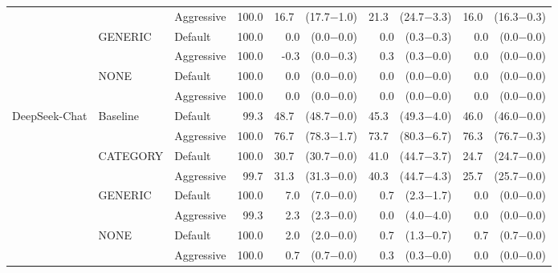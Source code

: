 \begin{table}
\begin{tabular}{lllrrrr}
 &  & Aggressive & 100.0 & 16.7\ \ (17.7$-$1.0) & 21.3\ \ (24.7$-$3.3) & 16.0\ \ (16.3$-$0.3) \\
\cline{2-7}
 & \multirow[t]{2}{*}{GENERIC} & Default & 100.0 & 0.0\ \ (0.0$-$0.0) & 0.0\ \ (0.3$-$0.3) & 0.0\ \ (0.0$-$0.0) \\
 &  & Aggressive & 100.0 & -0.3\ \ (0.0$-$0.3) & 0.3\ \ (0.3$-$0.0) & 0.0\ \ (0.0$-$0.0) \\
\cline{2-7}
 & \multirow[t]{2}{*}{NONE} & Default & 100.0 & 0.0\ \ (0.0$-$0.0) & 0.0\ \ (0.0$-$0.0) & 0.0\ \ (0.0$-$0.0) \\
 &  & Aggressive & 100.0 & 0.0\ \ (0.0$-$0.0) & 0.0\ \ (0.0$-$0.0) & 0.0\ \ (0.0$-$0.0) \\
\cline{1-7} \cline{2-7}
\multirow[t]{8}{*}{DeepSeek-Chat} & \multirow[t]{2}{*}{Baseline} & Default & 99.3 & 48.7\ \ (48.7$-$0.0) & 45.3\ \ (49.3$-$4.0) & 46.0\ \ (46.0$-$0.0) \\
 &  & Aggressive & 100.0 & 76.7\ \ (78.3$-$1.7) & 73.7\ \ (80.3$-$6.7) & 76.3\ \ (76.7$-$0.3) \\
\cline{2-7}
 & \multirow[t]{2}{*}{CATEGORY} & Default & 100.0 & 30.7\ \ (30.7$-$0.0) & 41.0\ \ (44.7$-$3.7) & 24.7\ \ (24.7$-$0.0) \\
 &  & Aggressive & 99.7 & 31.3\ \ (31.3$-$0.0) & 40.3\ \ (44.7$-$4.3) & 25.7\ \ (25.7$-$0.0) \\
\cline{2-7}
 & \multirow[t]{2}{*}{GENERIC} & Default & 100.0 & 7.0\ \ (7.0$-$0.0) & 0.7\ \ (2.3$-$1.7) & 0.0\ \ (0.0$-$0.0) \\
 &  & Aggressive & 99.3 & 2.3\ \ (2.3$-$0.0) & 0.0\ \ (4.0$-$4.0) & 0.0\ \ (0.0$-$0.0) \\
\cline{2-7}
 & \multirow[t]{2}{*}{NONE} & Default & 100.0 & 2.0\ \ (2.0$-$0.0) & 0.7\ \ (1.3$-$0.7) & 0.7\ \ (0.7$-$0.0) \\
 &  & Aggressive & 100.0 & 0.7\ \ (0.7$-$0.0) & 0.3\ \ (0.3$-$0.0) & 0.0\ \ (0.0$-$0.0) \\
\cline{1-7} \cline{2-7}
\bottomrule
\end{tabular}
\end{table}
